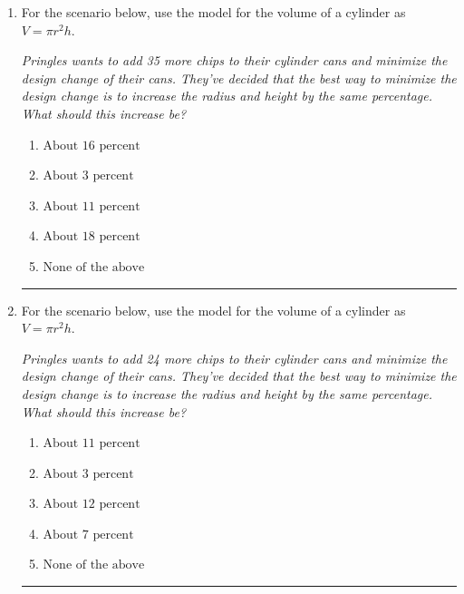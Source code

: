 \documentclass[14pt]{extbook}
\newcommand{\litem}[1]{\item#1\hspace*{-1cm}\rule{\textwidth}{0.4pt}}
\begin{document}
\begin{enumerate}
\litem{
For the scenario below, use the model for the volume of a cylinder as $V = \pi r^2 h$.
\begin{center}
    \textit{ Pringles wants to add 35 \text{percent} more chips to their cylinder cans and minimize the design change of their cans. They've decided that the best way to minimize the design change is to increase the radius and height by the same percentage. What should this increase be? }
\end{center}
\begin{enumerate}[label=\Alph*.]
\item \( \text{About } 16 \text{ percent} \)
\item \( \text{About } 3 \text{ percent} \)
\item \( \text{About } 11 \text{ percent} \)
\item \( \text{About } 18  \)
\item \( \text{None of the above} \)

\end{enumerate} }
\litem{
For the scenario below, use the model for the volume of a cylinder as $V = \pi r^2 h$.
\begin{center}
    \textit{ Pringles wants to add 24 \text{percent} more chips to their cylinder cans and minimize the design change of their cans. They've decided that the best way to minimize the design change is to increase the radius and height by the same percentage. What should this increase be? }
\end{center}
\begin{enumerate}[label=\Alph*.]
\item \( \text{About } 11 \text{ percent} \)
\item \( \text{About } 3 \text{ percent} \)
\item \( \text{About } 12 \text{ percent} \)
\item \( \text{About } 7 \text{ percent} \)
\item \( \text{None of the above} \)


\end{enumerate}}
\end{enumerate}
\end{document}
